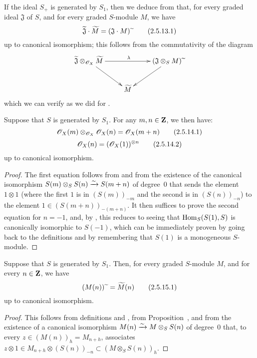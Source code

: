 If the ideal $S_+$ is generated by $S_1$, then we deduce from  that, for every graded ideal $\mathfrak{J}$ of $S$, and for every graded $S$-module $M$, we have
\[
\label{II.2.5.13.1}
  \widetilde{\mathfrak{J}}\cdot\widetilde{M} = (\mathfrak{J}\cdot M){\,\widetilde{\,}\,}
\tag{2.5.13.1}
\]
up to canonical isomorphism;
this follows from the commutativity of the diagram
\[
  \xymatrix{
    \widetilde{\mathfrak{J}}\otimes_{\sh{O}_X}\widetilde{M} \ar[rr]^\lambda \ar[dr]
    && (\mathfrak{J}\otimes_S M)\supertilde \ar[dl]
  \\&\widetilde{M}
  }
\]
which we can verify as we did for .

\begin{corollary}[2.5.14]
\label{II.2.5.14}
Suppose that $S$ is generated by $S_1$.
For any $m,n\in\mathbf{Z}$, we then have:
\[
\label{II.2.5.14.1}
  \mathscr{O}_X(m)\otimes_{\mathscr{O}_X}\mathscr{O}_X(n) = \mathscr{O}_X(m+n)
\tag{2.5.14.1}
\]
\[
\label{II.2.5.14.2}
  \mathscr{O}_X(n) = (\mathscr{O}_X(1))^{\otimes n}
\tag{2.5.14.2}
\]
up to canonical isomorphism.
\end{corollary}

\begin{proof}
The first equation follows from  and from the existence of the canonical isomorphism $S(m)\otimes_S S(n)\xrightarrow{\sim} S(m+n)$ of degree~$0$ that sends the element $1\otimes1$ (where the first $1$ is in $(S(m))_{-m}$ and the second is in $(S(n))_{-n}$) to the element $1\in(S(m+n))_{-(m+n)}$.
It then suffices to prove the second equation for $n=-1$, and, by , this reduces to seeing that $\operatorname{Hom}_S(S(1),S)$ is canonically isomorphic to $S(-1)$, which can be immediately proven by going back to the definitions  and by remembering that $S(1)$ is a monogeneous $S$-module.
\end{proof}

\begin{corollary}[2.5.15]
\label{II.2.5.15}
Suppose that $S$ is generated by $S_1$.
Then, for every graded $S$-module $M$, and for every $n\in\mathbf{Z}$, we have
\[
\label{II.2.5.15.1}
  (M(n)){\,\widetilde{\,}\,} = \widetilde{M}(n)
\tag{2.5.15.1}
\]
up to canonical isomorphism.
\end{corollary}

\begin{proof}
This follows from definitions  and , from Proposition~, and from the existence of a canonical isomorphism $M(n)\xrightarrow{\sim} M\otimes_S S(n)$ of degree~$0$ that, to every $z\in(M(n))_h=M_{n+h}$, associates $z\otimes1\in M_{n+h}\otimes(S(n))_{-n}\subset(M\otimes_S S(n))_h$.
\end{proof}

